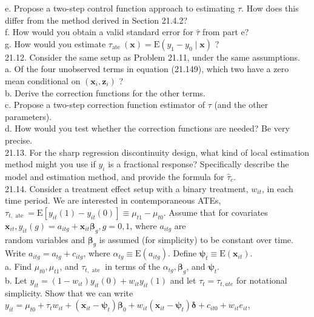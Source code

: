 \documentclass[10pt]{article}
\begin{document}
e. Propose a two-step control function approach to estimating $\tau$. How does this differ from the method derived in Section 21.4.2?\\
f. How would you obtain a valid standard error for $\hat{\tau}$ from part e?\\
g. How would you estimate $\tau_{\text {ate }}(\mathbf{x})=\mathrm{E}\left(y_{1}-y_{0} \mid \mathbf{x}\right)$ ?\\
21.12. Consider the same setup as Problem 21.11, under the same assumptions.\\
a. Of the four unobserved terms in equation (21.149), which two have a zero mean conditional on $\left(\mathbf{x}_{i}, \mathbf{z}_{i}\right)$ ?\\
b. Derive the correction functions for the other terms.\\
c. Propose a two-step correction function estimator of $\tau$ (and the other parameters).\\
d. How would you test whether the correction functions are needed? Be very precise.\\
21.13. For the sharp regression discontinuity design, what kind of local estimation method might you use if $y_{i}$ is a fractional response? Specifically describe the model and estimation method, and provide the formula for $\hat{\tau}_{c}$.\\
21.14. Consider a treatment effect setup with a binary treatment, $w_{i t}$, in each time period. We are interested in contemporaneous ATEs, $\tau_{t, \text { ate }}=\mathrm{E}\left[y_{i t}(1)-y_{i t}(0)\right] \equiv \mu_{t 1}-\mu_{t 0}$. Assume that for covariates $\mathbf{x}_{i t}, y_{i t}(g)=a_{i t g}+\mathbf{x}_{i t} \boldsymbol{\beta}_{g}, g=0,1$, where $a_{i t g}$ are\\
random variables and $\boldsymbol{\beta}_{g}$ is assumed (for simplicity) to be constant over time. Write $a_{i t g}=a_{t g}+c_{i t g}$, where $\alpha_{t g} \equiv \mathrm{E}\left(a_{i t g}\right)$. Define $\boldsymbol{\psi}_{t} \equiv \mathrm{E}\left(\mathbf{x}_{i t}\right)$.\\
a. Find $\mu_{t 0}, \mu_{t 1}$, and $\tau_{t, \text { ate }}$ in terms of the $\alpha_{t g}, \boldsymbol{\beta}_{g}$, and $\boldsymbol{\psi}_{t}$.\\
b. Let $y_{i t}=\left(1-w_{i t}\right) y_{i t}(0)+w_{i t} y_{i t}(1)$ and let $\tau_{t}=\tau_{t, a t e}$ for notational simplicity. Show that we can write\\
$y_{i t}=\mu_{t 0}+\tau_{t} w_{i t}+\left(\mathbf{x}_{i t}-\boldsymbol{\psi}_{t}\right) \boldsymbol{\beta}_{0}+w_{i t}\left(\mathbf{x}_{i t}-\boldsymbol{\psi}_{t}\right) \boldsymbol{\delta}+c_{i t 0}+w_{i t} e_{i t}$,\\
\end{document}
